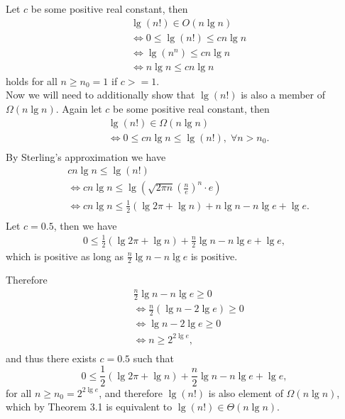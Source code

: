 \documentclass[11pt]{article}
\numberwithin{equation}{section}
\renewcommand{\iff}{\Leftrightarrow}
\begin{document}
Let $c$ be some positive real constant, then
\[
\begin{split}
    & \lg(n!) \in O(n \lg n) \\
    & \iff 0 \leq \lg(n!) \leq c n \lg n \\
    & \iff \lg (n^n) \leq c n \lg n \\
    & \iff n \lg n \leq c n \lg n
\end{split}
\]
holds for all $n \geq n_0 = 1$ if $c >= 1$.\\

Now we will need to additionally show that $\lg(n!)$ is also
a member of $\Omega(n \lg n)$.
Again let $c$ be some positive real constant, then
\[
\begin{split}
    & \lg(n!) \in \Omega(n \lg n) \\
    & \iff 0 \leq c n \lg n \leq \lg(n!), \; \forall n > n_0.\\
\end{split}
\]
By Sterling's approximation we have
\[
\begin{split}
    & c n \lg n \leq \lg(n!)\\
    & \iff cn \lg n
        \leq \lg \left(\sqrt{2\pi n}\left(\frac{n}{e}\right)^n \cdot e \right) \\
    & \iff cn \lg n \leq \frac{1}{2} (\lg {2\pi} + \lg n) + n\lg n - n\lg e + \lg e.\\
\end{split}
\]
Let $c = 0.5$, then we have
\[
\begin{split}
    0 \leq \frac{1}{2} (\lg {2\pi} + \lg n) + \frac{n}{2} \lg n - n\lg e + \lg e, 
\end{split}
\]
which is positive as long as $\frac{n}{2} \lg n - n\lg e$ is positive.\\
\pagebreak

Therefore 
\[
\begin{split}
    & \frac{n}{2} \lg n - n\lg e \geq 0\\
    & \iff \frac{n}{2} (\lg n - 2\lg e) \geq 0\\
    & \iff \lg n - 2\lg e \geq 0\\
    & \iff n \geq 2^{2\lg e},\\
\end{split}
\]
and thus there exists $c = 0.5$ such that 
\[
    0 \leq \frac{1}{2} (\lg {2\pi} + \lg n) + \frac{n}{2} \lg n - n\lg e + \lg e, 
\]
for all $n \geq n_0 = 2^{2 \lg e}$, and therefore $\lg (n!)$ is 
also element of $\Omega (n \lg n)$, which by Theorem 3.1 is equivalent to
$\lg(n!) \in \Theta(n \lg n)$.\\
\end{document}
